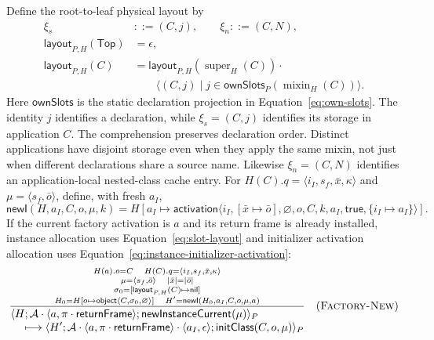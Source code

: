 \documentclass[11pt]{article}
\numberwithin{equation}{section}
\newcommand{\kw}[1]{\ensuremath{\mathsf{#1}}}
\newcommand{\nil}{\kw{nil}}
\newcommand{\Top}{\kw{Top}}
\newcommand{\super}{\mathop{\mathrm{super}}}
\newcommand{\mixin}{\mathop{\mathrm{mixin}}}
\newcommand{\rulelabel}[1]{\textsc{#1}}
\begin{document}
Define the root-to-leaf physical layout by
\begin{equation}\label{eq:slot-layout}
\begin{aligned}
 \xi_s&::=(C,j),\qquad \xi_n::=(C,N),\\
 \mathsf{layout}_{P,H}(\Top)&=\epsilon,\\
 \mathsf{layout}_{P,H}(C)&=
   \mathsf{layout}_{P,H}(\super_H(C))\cdot{}\\
 &\qquad\langle (C,j)\mid j\in\mathsf{ownSlots}_P(\mixin_H(C))\rangle.
\end{aligned}
\end{equation}
Here $\mathsf{ownSlots}$ is the static declaration projection in
Equation~\eqref{eq:own-slots}.  The identity $j$ identifies a declaration,
while $\xi_s=(C,j)$ identifies its storage
in application $C$.  The comprehension preserves declaration order.
Distinct applications have disjoint storage even when they apply the same
mixin, not just when different declarations share a source name.  Likewise
$\xi_n=(C,N)$ identifies an application-local nested-class cache entry.  For
$H(C).q=\langle i_I,s_f,\bar x,\kappa\rangle$ and
$\mu=\langle s_f,\bar o\rangle$, define, with fresh $a_I$,
\begin{equation}\label{eq:instance-initializer-activation}
 \mathsf{newI}(H,a_I,C,o,\mu,k)=
 H[a_I\mapsto\kw{activation}\langle
 i_I,[\bar x\mapsto\bar o],\varnothing,o,C,k,a_I,\kw{true},
 \{i_I\mapsto a_I\}\rangle].
\end{equation}
If the current factory activation is $a$ and its return frame is already
installed, instance allocation uses Equation~\eqref{eq:slot-layout} and
initializer activation allocation uses
Equation~\eqref{eq:instance-initializer-activation}:
\[
\dfrac{\substack{H(a).o=C\quad
       H(C).q=\langle i_I,s_f,\bar x,\kappa\rangle\\
       \mu=\langle s_f,\bar o\rangle\quad |\bar x|=|\bar o|\\
       \sigma_0=[\mathsf{layout}_{P,H}(C)\mapsto\nil]\\
       H_0=H[o\mapsto\kw{object}\langle C,\sigma_0,\varnothing\rangle]\quad
       H'=\mathsf{newI}(H_0,a_I,C,o,\mu,a)}}
 {\begin{aligned}
  &\langle H;\mathcal A\cdot\langle a,
       \pi\cdot\kw{returnFrame}\rangle;\kw{newInstanceCurrent}(\mu)\rangle_P\\[-1mm]
  &\quad\longmapsto
   \langle H';\mathcal A\cdot\langle a,\pi\cdot\kw{returnFrame}\rangle
                    \cdot\langle a_I,\epsilon\rangle;
       \kw{initClass}(C,o,\mu)\rangle_P
 \end{aligned}}
\quad(\rulelabel{Factory-New})
\]
\end{document}
